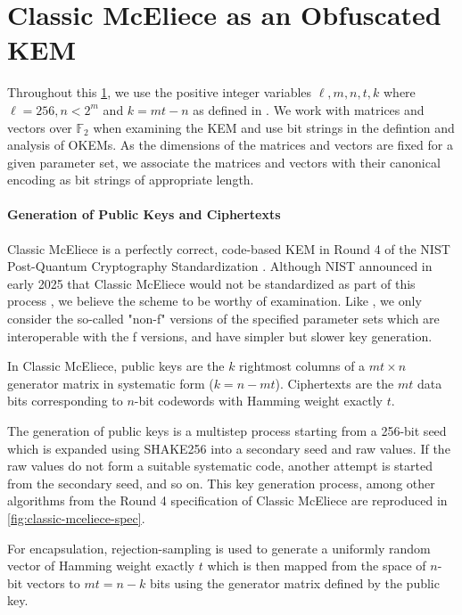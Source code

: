 \section{Classic McEliece as an Obfuscated KEM} \label{sec:obfuscating-classic-mceliece}

Throughout this \cref{sec:obfuscating-classic-mceliece}, we use the positive integer variables $\ell, m,n,t,k$ where $\ell = 256, n < 2^m$ and $k=mt-n$ as defined in \cite{NISTPQC-R4:ClassicMcEliece22}. We work with matrices and vectors over $\mathbb F_2$ when examining the KEM and use bit strings in the defintion and analysis of OKEMs. As the dimensions of the matrices and vectors are fixed for a given parameter set, we associate the matrices and vectors with their canonical encoding as bit strings of appropriate length.

\paragraph{Generation of Public Keys and Ciphertexts}
Classic McEliece \cite{NISTPQC-R4:ClassicMcEliece22} is a perfectly correct, code-based KEM in Round 4 of the NIST Post-Quantum Cryptography Standardization \cite{nist-standardization}. Although NIST announced in early 2025 that Classic McEliece would not be standardized as part of this process \cite{nist-ir-8545}, we believe the scheme to be worthy of examination. Like \cite{EC:Xagawa22}, we only consider the so-called "non-f" versions of the specified parameter sets which are interoperable with the f versions, and have simpler but slower key generation.
 
In Classic McEliece, public keys are the $k$ rightmost columns of a $mt \times n$ generator matrix in systematic form ($k = n - mt$). Ciphertexts are the $mt$ data bits corresponding to $n$-bit codewords with Hamming weight exactly $t$.

The generation of public keys is a multistep process starting from a 256-bit seed which is expanded using SHAKE256 into a secondary seed and raw values. If the raw values do not form a suitable systematic code, another attempt is started from the secondary seed, and so on. This key generation process, among other algorithms from the Round 4 specification of Classic McEliece are reproduced in \cref{fig:classic-mceliece-spec}.

For encapsulation, rejection-sampling is used to generate a uniformly random vector of Hamming weight exactly $t$ which is then mapped from the space of $n$-bit vectors to $mt=n-k$ bits using the generator matrix defined by the public key.


